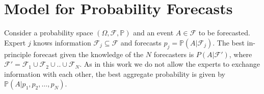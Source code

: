 \documentclass[11pt,twoside]{article}
\renewcommand{\P}{\mathbb{P}}
\begin{document}
%
%
%
%
%

\section{Model for Probability Forecasts}
\label{Model}
Consider a probability space $(\Omega, \mathcal{F}, \P)$ and an event $A \in \mathcal{F}$ to be forecasted. Expert $j$ knows information $\mathcal{F}_j \subseteq \mathcal{F}$ and forecasts $p_j = \P(A | \mathcal{F}_j)$. The best in-principle forecast given the knowledge of the $N$ forecasters is $P(A | \mathcal{F}')$, where $\mathcal{F}' = \mathcal{F}_1 \cup \mathcal{F}_2 \cup .. \cup \mathcal{F}_N$. As in this work we do not allow the experts to exchange information with each other, the best aggregate probability is given by $\P(A | p_1, p_2, \dots, p_N)$.
\end{document}

